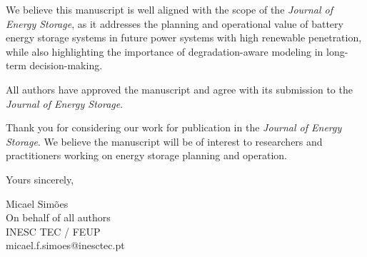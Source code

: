 \documentclass[12pt]{letter}
\begin{document}
\begin{letter}{}
    We believe this manuscript is well aligned with the scope of the \textit{Journal of Energy Storage}, as it addresses the planning and operational value of battery energy storage systems in future power systems with high renewable penetration, while also highlighting the importance of degradation-aware modeling in long-term decision-making.
    
    All authors have approved the manuscript and agree with its submission to the \textit{Journal of Energy Storage}.
    
    Thank you for considering our work for publication in the \textit{Journal of Energy Storage}. We believe the manuscript will be of interest to researchers and practitioners working on energy storage planning and operation.
    
    \closing{Yours sincerely,}    
    Micael Simões\\
    On behalf of all authors\\
    INESC TEC / FEUP\\
    micael.f.simoes@inesctec.pt

\end{letter}
\end{document}
